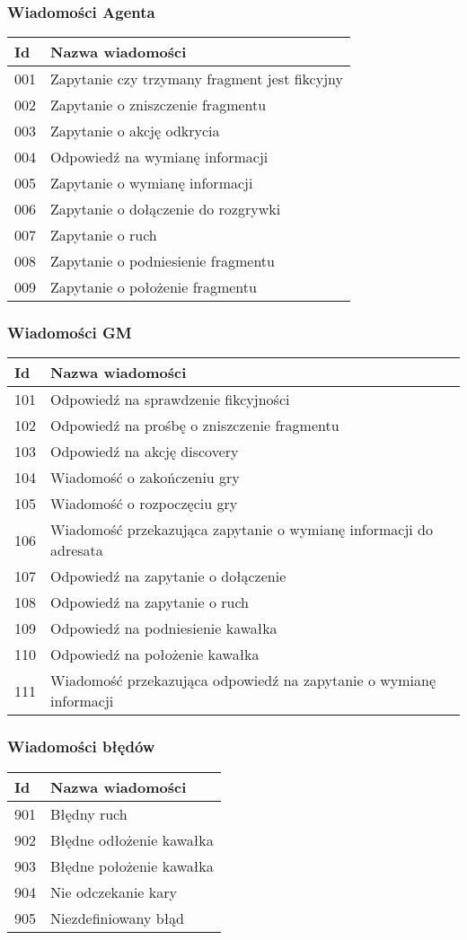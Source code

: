 \documentclass[Dokumentacja.tex]{subfiles}
\begin{document}
\subsubsection{Wiadomości Agenta}
\begin{tabular}{ |p{1cm}|p{12cm}| }
 \hline
 Id & Nazwa wiadomości \\
 \hline
 001 & Zapytanie czy trzymany fragment jest fikcyjny \\
 002 & Zapytanie o zniszczenie fragmentu \\
 003 & Zapytanie o akcję odkrycia \\
 004 & Odpowiedź na wymianę informacji \\
 005 & Zapytanie o wymianę informacji \\
 006 & Zapytanie o dołączenie do rozgrywki \\
 007 & Zapytanie o ruch \\
 008 & Zapytanie o podniesienie fragmentu \\
 009 & Zapytanie o położenie fragmentu \\
 \hline
\end{tabular}

\subsubsection{Wiadomości GM}
\begin{tabular}{ |p{1cm}|p{12cm}| }
 \hline
 Id & Nazwa wiadomości \\
 \hline
 101 & Odpowiedź na sprawdzenie fikcyjności \\
 102 & Odpowiedź na prośbę o zniszczenie fragmentu \\
 103 & Odpowiedź na akcję discovery \\
 104 & Wiadomość o zakończeniu gry \\
 105 & Wiadomość o rozpoczęciu gry \\
 106 & Wiadomość przekazująca zapytanie o wymianę informacji do adresata \\
 107 & Odpowiedź na zapytanie o dołączenie \\
 108 & Odpowiedź na zapytanie o ruch \\
 109 & Odpowiedź na podniesienie kawałka \\
 110 & Odpowiedź na położenie kawałka \\
 111 & Wiadomość przekazująca odpowiedź na zapytanie o wymianę informacji \\
 \hline
\end{tabular}

\subsubsection{Wiadomości błędów}
\begin{tabular}{ |p{1cm}|p{12cm}| }
 \hline
 Id & Nazwa wiadomości \\
 \hline
 901 & Błędny ruch \\
 902 & Błędne odłożenie kawałka \\
 903 & Błędne położenie kawałka \\
 904 & Nie odczekanie kary \\
 905 & Niezdefiniowany błąd \\
 \hline
\end{tabular}
\end{document}
